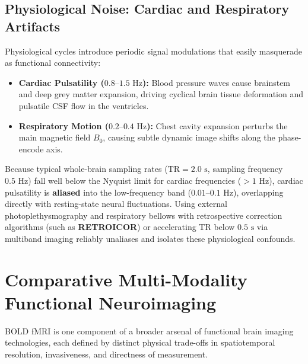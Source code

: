 \documentclass[11pt,a4paper]{article}
\begin{document}
\subsection{Physiological Noise: Cardiac and Respiratory Artifacts}
Physiological cycles introduce periodic signal modulations that easily masquerade as functional connectivity:
\begin{itemize}
    \item \textbf{Cardiac Pulsatility ($0.8\text{--}1.5\text{ Hz}$):} Blood pressure waves cause brainstem and deep grey matter expansion, driving cyclical brain tissue deformation and pulsatile CSF flow in the ventricles.
    \item \textbf{Respiratory Motion ($0.2\text{--}0.4\text{ Hz}$):} Chest cavity expansion perturbs the main magnetic field $B_0$, causing subtle dynamic image shifts along the phase-encode axis.
\end{itemize}
Because typical whole-brain sampling rates ($\text{TR} = 2.0\text{ s}$, sampling frequency $0.5\text{ Hz}$) fall well below the Nyquist limit for cardiac frequencies ($> 1\text{ Hz}$), cardiac pulsatility is \textbf{aliased} into the low-frequency band ($0.01\text{--}0.1\text{ Hz}$), overlapping directly with resting-state neural fluctuations. Using external photoplethysmography and respiratory bellows with retrospective correction algorithms (such as \textbf{RETROICOR}) or accelerating TR below $0.5\text{ s}$ via multiband imaging reliably unaliases and isolates these physiological confounds.

\section{Comparative Multi-Modality Functional Neuroimaging}
BOLD fMRI is one component of a broader arsenal of functional brain imaging technologies, each defined by distinct physical trade-offs in spatiotemporal resolution, invasiveness, and directness of measurement.
\end{document}
